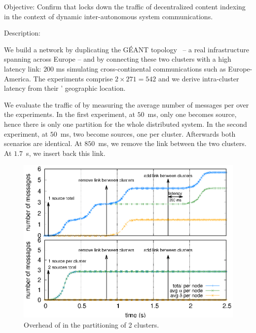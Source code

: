 

\begin{asparadesc}

\item [Objective:] Confirm that \NAME locks down the traffic of decentralized content
  indexing in the context of dynamic inter-autonomous system
  communications.
  
\item [Description:]

We build a network by duplicating the G{\'E}ANT
topology~\cite{knight2011internet} -- a real infrastructure spanning
across Europe -- and by connecting these two clusters with a high
latency link: $200$ ms simulating cross-continental communications
such as Europe-America. The experiments comprise $2 \times 271 = 542$
\processes and we derive intra-cluster latency from their \processes'
geographic location.

\noindent We evaluate the traffic of \NAME by measuring the average
number of messages per \process over the experiments. In the first
experiment, at $50$~ms, only one \process becomes source, hence there
is only one partition for the whole distributed system. In the second
experiment, at $50$~ms, two \processes become sources, one per
cluster. Afterwards both scenarios are identical. At $850$~ms, we
remove the link between the two clusters. At $1.7$~s, we insert back this
link.

\begin{figure}
  \centering\includegraphics[width=0.61\columnwidth]{img/as_cast_geant.eps}
  \caption{\label{fig:geant}Overhead of \NAME in the partitioning of 2 clusters.}
\end{figure}


\end{asparadesc}
